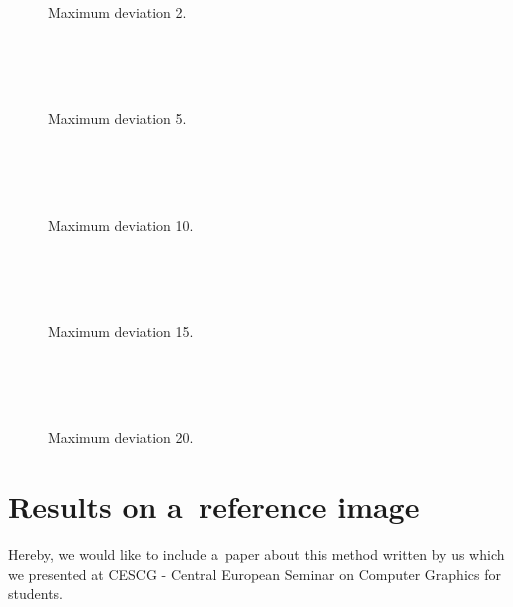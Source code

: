 \begin{figure}
	\begin{center}
		 \\ 
		 \\ 
		 \\ 
	\end{center}
	\caption{Maximum deviation 2.}
\end{figure}

\begin{figure}
	\begin{center}
		 \\ 
		 \\ 
		 \\ 
	\end{center}
	\caption{Maximum deviation 5.}
\end{figure}

\begin{figure}
	\begin{center}
		 \\ 
		 \\ 
		 \\ 
	\end{center}
	\caption{Maximum deviation 10.}
\end{figure}

\begin{figure}
	\begin{center}
		 \\ 
		 \\ 
		 \\ 
	\end{center}
	\caption{Maximum deviation 15.}
\end{figure}

\begin{figure}
	\begin{center}
		 \\ 
		 \\ 
		 \\ 
	\end{center}
	\caption{Maximum deviation 20.}
\end{figure}

\chapter{Results on a~reference image}
\label{att:paper}

Hereby, we would like to include a~paper about this method written by us which we presented at CESCG - Central European Seminar on Computer Graphics for students.
%
